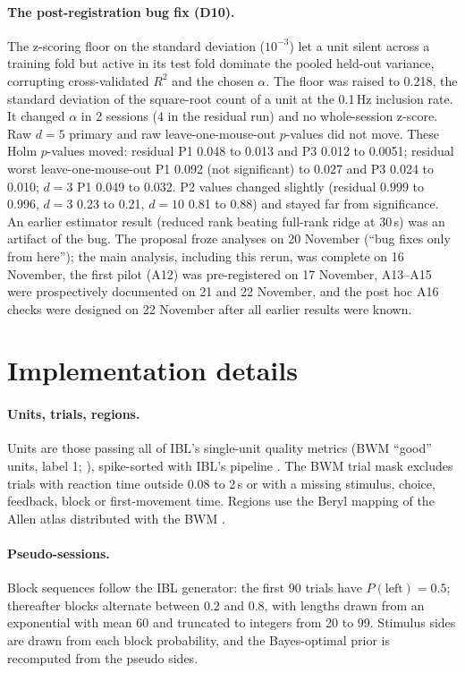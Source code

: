 \documentclass{article}
\begin{document}
\paragraph{The post-registration bug fix (D10).} The z-scoring floor on the standard deviation ($10^{-3}$) let a unit
silent across a training fold but active in its test fold dominate the pooled held-out variance, corrupting
cross-validated $R^2$ and the chosen $\alpha$. The floor was raised to 0.218, the standard deviation of the
square-root count of a unit at the 0.1\,Hz inclusion rate. It changed $\alpha$ in 2 sessions (4 in the residual run)
and no whole-session z-score. Raw $d=5$ primary and raw leave-one-mouse-out $p$-values did not move. These Holm
$p$-values moved: residual P1 0.048 to 0.013 and P3 0.012 to 0.0051; residual worst leave-one-mouse-out P1 0.092 (not
significant) to 0.027 and P3 0.024 to 0.010; $d=3$ P1 0.049 to 0.032. P2 values changed slightly (residual 0.999 to
0.996, $d=3$ 0.23 to 0.21, $d=10$ 0.81 to 0.88) and stayed far from significance. An earlier estimator result
(reduced rank beating full-rank ridge at 30\,s) was an artifact of the bug. The proposal froze analyses on 20 November
(``bug fixes only from here''); the main analysis, including this rerun, was complete on 16 November, the first pilot (A12) was pre-registered on 17 November, A13--A15 were prospectively documented on 21 and 22
November, and the post hoc A16 checks were designed on 22 November after all earlier results were known.

\section{Implementation details}
\label{app:impl}

\paragraph{Units, trials, regions.} Units are those passing all of IBL's single-unit quality metrics (BWM ``good''
units, label 1; \citealp{iblrepro2025}), spike-sorted with IBL's pipeline \citep{iblsort2022}. The BWM trial mask
excludes trials with reaction time outside 0.08 to 2\,s or with a missing stimulus, choice, feedback, block or
first-movement time. Regions use the Beryl mapping of the Allen atlas distributed with the BWM \citep{ibl2025bwm}.

\paragraph{Pseudo-sessions.} Block sequences follow the IBL generator: the first 90 trials have $P(\text{left})=0.5$;
thereafter blocks alternate between 0.2 and 0.8, with lengths drawn from an exponential with mean 60 and truncated to
integers from 20 to 99. Stimulus sides are drawn from each block probability, and the Bayes-optimal prior is
recomputed from the pseudo sides.
\end{document}
